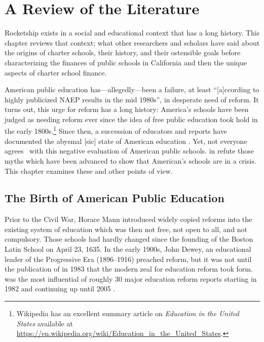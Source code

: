 \chapter{A Review of the Literature}\label{ch:litreview}\indent%
Rocketship exists in a social and educational context that has a long history. This chapter reviews that context; what other researchers and scholars have said about the origins of charter schools, their history, and their ostensible goals before characterizing the finances of public schools in California and then the unique aspects of charter school finance. 

 American public education has—allegedly—been a failure, at least ``[a]ccording to highly publicized NAEP results in the mid 1980s'', in desperate need of reform. It turns out, this urge for reform has a long history: America's schools have been judged as needing reform ever since the idea of free public education took hold in the early 1800s.\footnote{Wikipedia has an excellent summary article on \textit{Education in the United States} available at \url{https://en.wikipedia.org/wiki/Education_in_the_United_States}.} Since then, a succession of educators and reports have documented the abysmal [sic] state of American education \parencite{Gove.Meier2000}. Yet, not everyone agrees  with this negative evaluation of American public schools. \textcite{Berliner.Glass2014} in  refute those myths which have been advanced to show that American's schools are in a crisis. This chapter examines these and other points of view.

\section{The Birth of American Public Education}\label{sec:birth-amer-publ}\indent%

Prior to the Civil War, Horace Mann introduced widely copied reforms \parencite%
{Pulliam.VanPatten2007} into the existing system of education which was then not free, not open to all, and not compulsory. Those schools had hardly changed since the founding of the Boston Latin School on April 23, 1635. In the early 1900s, John Dewey, an educational leader of the Progressive Era (1896–1916) preached reform, but it was not until the publication of  in 1983 that the modern zeal for education reform took form.  was the most influential of roughly 30  major education reform reports starting in 1982 and continuing up until 2005 \textcite[252]{Pulliam.VanPatten2007}.

